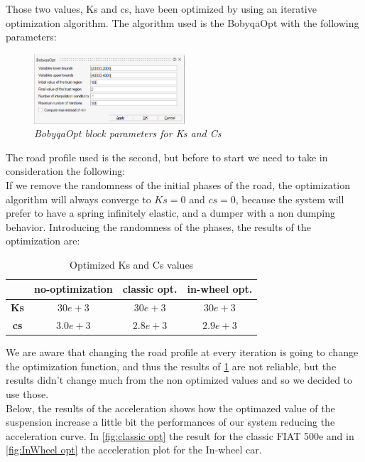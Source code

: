 \documentclass{article}
\numberwithin{equation}{section}
\numberwithin{figure}{section}
\numberwithin{table}{section}
\numberwithin{table}{section}
\begin{document}
Those two values, Ks and cs, have been optimized by using an iterative optimization algorithm.
The algorithm used is the BobyqaOpt with the following parameters:
\begin{figure}[H]
    \centering
    \includegraphics[width=0.5\textwidth]{Pictures/bobyaopt_param.PNG}
    \caption{\emph{BobyqaOpt block parameters for Ks and Cs}}
    \label{fig:bobyaopt_param}
\end{figure}
The road profile used is the second, but before to start we need to take in consideration the following:\\
If we remove the randomness of the initial phases of the road, the optimization algorithm will always converge to $Ks=0$ and $cs=0$, because the system will prefer to have a spring infinitely elastic, and a dumper with a non dumping behavior. Introducing the randomness of the phases, the results of the optimization are:
\begin{table}[H]
    \centering
    \begin{tabular}{|c|c|c|c|}
    \hline
         &no-optimization& classic opt. & in-wheel opt. \\
         \hline\hline
         \textbf{Ks}& $30e+3$ &$30e+3$ &$30e+3$\\
         \hline
         \textbf{cs}& $3.0e+3$ & $2.8e+3$ & $2.9e+3$\\
         \hline
    \end{tabular}
    \caption{Optimized Ks and Cs values}
    \label{tab:optimization_cs_ks}
\end{table}
We are aware that changing the road profile at every iteration is going to change the optimization function, and thus the results of \cref{tab:optimization_cs_ks} are not reliable, but the results didn't change much from the non optimized values and so we decided to use those.\\
Below, the results of the acceleration shows how the optimazed value of the suspension increase a little bit the performances of our system reducing the acceleration curve.
In \cref{fig:classic opt} the result for the classic FIAT 500e and in \cref{fig:InWheel opt} the acceleration plot for the In-wheel car.\\
\end{document}
